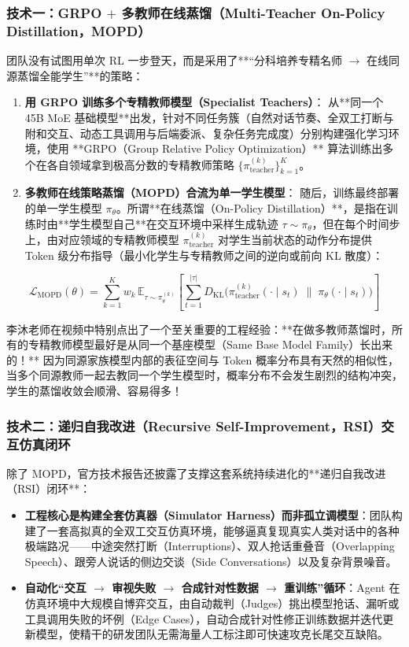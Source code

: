 \documentclass[a4paper]{article}
\begin{document}
\subsubsection{技术一：GRPO $+$ 多教师在线蒸馏（Multi-Teacher On-Policy Distillation，MOPD）}
团队没有试图用单次 RL 一步登天，而是采用了**“分科培养专精名师 $\to$ 在线同源蒸馏全能学生”**的策略：
\begin{enumerate}
    \item \textbf{用 GRPO 训练多个专精教师模型（Specialist Teachers）}：
    从**同一个 45B MoE 基础模型**出发，针对不同任务簇（自然对话节奏、全双工打断与附和交互、动态工具调用与后端委派、复杂任务完成度）分别构建强化学习环境，使用 **GRPO（Group Relative Policy Optimization）** 算法训练出多个在各自领域拿到极高分数的专精教师策略 $\{\pi_{\mathrm{teacher}}^{(k)}\}_{k=1}^K$。
    \item \textbf{多教师在线策略蒸馏（MOPD）合流为单一学生模型}：
    随后，训练最终部署的单一学生模型 $\pi_{\theta}$。所谓**在线蒸馏（On-Policy Distillation）**，是指在训练时由**学生模型自己**在交互环境中采样生成轨迹 $\tau \sim \pi_{\theta}$，但在每个时间步上，由对应领域的专精教师模型 $\pi_{\mathrm{teacher}}^{(k)}$ 对学生当前状态的动作分布提供 Token 级分布指导（最小化学生与专精教师之间的逆向或前向 KL 散度）：
\end{enumerate}

\begin{equation}
\mathcal{L}_{\mathrm{MOPD}}(\theta)
= \sum_{k=1}^K w_k\,\mathbb{E}_{\tau \sim \pi_{\theta}^{(k)}}\!\left[
\sum_{t=1}^{|\tau|} D_{\mathrm{KL}}\!\Big(\pi_{\mathrm{teacher}}^{(k)}(\cdot \mid s_t)\;\Big\|\;\pi_{\theta}(\cdot \mid s_t)\Big)
\right]
\end{equation}

李沐老师在视频中特别点出了一个至关重要的工程经验：**在做多教师蒸馏时，所有的专精教师模型最好是从同一个基座模型（Same Base Model Family）长出来的！** 因为同源家族模型内部的表征空间与 Token 概率分布具有天然的相似性，当多个同源教师一起去教同一个学生模型时，概率分布不会发生剧烈的结构冲突，学生的蒸馏收敛会顺滑、容易得多！

\subsubsection{技术二：递归自我改进（Recursive Self-Improvement，RSI）交互仿真闭环}
除了 MOPD，官方技术报告还披露了支撑这套系统持续进化的**递归自我改进（RSI）闭环**：
\begin{itemize}
    \item \textbf{工程核心是构建全套仿真器（Simulator Harness）而非孤立调模型}：团队构建了一套高拟真的全双工交互仿真环境，能够逼真复现真实人类对话中的各种极端路况——中途突然打断（Interruptions）、双人抢话重叠音（Overlapping Speech）、跟旁人说话的侧边交谈（Side Conversations）以及复杂背景噪音。
    \item \textbf{自动化“交互 $\to$ 审视失败 $\to$ 合成针对性数据 $\to$ 重训练”循环}：Agent 在仿真环境中大规模自博弈交互，由自动裁判（Judges）挑出模型抢话、漏听或工具调用失败的坏例（Edge Cases），自动合成针对性修正训练数据并迭代更新模型，使精干的研发团队无需海量人工标注即可快速攻克长尾交互缺陷。
\end{itemize}
\end{document}
